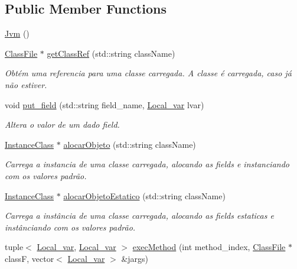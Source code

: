 \subsection*{Public Member Functions}
\begin{DoxyCompactItemize}
\item 
\hyperlink{classJvm_a2bbdf6ed1c101825a440bd38dfa54a5a}{Jvm} ()
\item 
\hyperlink{classClassFile}{Class\+File} $\ast$ \hyperlink{classJvm_a6c159c7b6eed436d26b95e4af9fdca87}{get\+Class\+Ref} (std\+::string class\+Name)
\begin{DoxyCompactList}\small\item\em Obtém uma referencia para uma classe carregada. A classe é carregada, caso já não estiver. \end{DoxyCompactList}\item 
void \hyperlink{classJvm_a828e1608fdac86ee26615021e2b63a80}{put\+\_\+field} (std\+::string field\+\_\+name, \hyperlink{classLocal__var}{Local\+\_\+var} lvar)
\begin{DoxyCompactList}\small\item\em Altera o valor de um dado field. \end{DoxyCompactList}\item 
\hyperlink{classInstanceClass}{Instance\+Class} $\ast$ \hyperlink{classJvm_a854b6ba06d1a9187ec7699861c57e3a3}{alocar\+Objeto} (std\+::string class\+Name)
\begin{DoxyCompactList}\small\item\em Carrega a instancia de uma classe carregada, alocando as fields e instanciando com os valores padrão. \end{DoxyCompactList}\item 
\hyperlink{classInstanceClass}{Instance\+Class} $\ast$ \hyperlink{classJvm_a03ab322c195c906da1da0455a4ef794f}{alocar\+Objeto\+Estatico} (std\+::string class\+Name)
\begin{DoxyCompactList}\small\item\em Carrega a instância de uma classe carregada, alocando as fields estaticas e instânciando com os valores padrão. \end{DoxyCompactList}\item 
tuple$<$ \hyperlink{classLocal__var}{Local\+\_\+var}, \hyperlink{classLocal__var}{Local\+\_\+var} $>$ \hyperlink{classJvm_adc00dfd960276f1d115debcf8f0a2a9c}{exec\+Method} (int method\+\_\+index, \hyperlink{classClassFile}{Class\+File} $\ast$class\+F, vector$<$ \hyperlink{classLocal__var}{Local\+\_\+var} $>$ \&jargs)

\end{DoxyCompactItemize}
